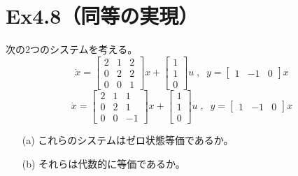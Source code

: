 \documentclass{jsarticle}
\begin{document}
\section*{Ex4.8（同等の実現）}
次の2つのシステムを考える。
\begin{equation}
  \dot{x} = 
  \begin{bmatrix}
    2&1&2\\
    0&2&2\\
    0&0&1
  \end{bmatrix}x+
    \begin{bmatrix}
      1\\1\\0
    \end{bmatrix}u\;,\;\;y=
    \begin{bmatrix}
      1&-1&0
    \end{bmatrix}x
\end{equation}
\begin{equation}
  \dot{x} = 
  \begin{bmatrix}
    2&1&1\\
    0&2&1\\
    0&0&-1
  \end{bmatrix}x+
    \begin{bmatrix}
      1\\1\\0
    \end{bmatrix}u\;,\;\;y=
    \begin{bmatrix}
      1&-1&0
    \end{bmatrix}x
\end{equation}
\begin{itemize}
  \item[(a)] これらのシステムはゼロ状態等価であるか。
  \item[(b)] それらは代数的に等価であるか。
\end{itemize}
\;\\
\end{document}
